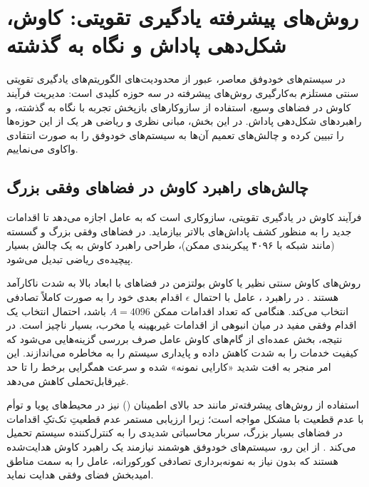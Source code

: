 \documentclass[oneside,openany,phd]{TMU-Thesis}
\begin{document}
\section{روش‌های پیشرفته یادگیری تقویتی: کاوش، شکل‌دهی پاداش و نگاه به گذشته}
\label{sec:ch3_advanced_rl}

در سیستم‌های خودوفق معاصر، عبور از محدودیت‌های الگوریتم‌های یادگیری تقویتی سنتی مستلزم به‌کارگیری روش‌های پیشرفته در سه حوزه کلیدی است: مدیریت فرآیند کاوش در فضاهای وسیع، استفاده از سازوکارهای بازپخش تجربه با نگاه به گذشته، و راهبردهای شکل‌دهی پاداش. در این بخش، مبانی نظری و ریاضی هر یک از این حوزه‌ها را تبیین کرده و چالش‌های تعمیم آن‌ها به سیستم‌های خودوفق را به صورت انتقادی واکاوی می‌نماییم.

\subsection{چالش‌های راهبرد کاوش در فضاهای وفقی بزرگ}
\label{sec:ch3_exploration_challenges}

فرآیند کاوش در یادگیری تقویتی، سازوکاری است که به عامل اجازه می‌دهد تا اقدامات جدید را به منظور کشف پاداش‌های بالاتر بیازماید. در فضاهای وفقی بزرگ و گسسته (مانند شبکه  با ۴۰۹۶ پیکربندی ممکن)، طراحی راهبرد کاوش به یک چالش بسیار پیچیده‌ی ریاضی تبدیل می‌شود.

روش‌های کاوش سنتی نظیر  یا کاوش بولتزمن در فضاهای با ابعاد بالا به شدت ناکارآمد هستند \cite{du2023scalability, du2023alleviating}. در راهبرد ، عامل با احتمال $\epsilon$ اقدام بعدی خود را به صورت کاملاً تصادفی انتخاب می‌کند. هنگامی که تعداد اقدامات ممکن $A = 4096$ باشد، احتمال انتخاب یک اقدام وفقی مفید در میان انبوهی از اقدامات غیربهینه یا مخرب، بسیار ناچیز است. در نتیجه، بخش عمده‌ای از گام‌های کاوش عامل صرف بررسی گزینه‌هایی می‌شود که کیفیت خدمات را به شدت کاهش داده و پایداری سیستم را به مخاطره می‌اندازند. این امر منجر به افت شدید «کارایی نمونه» شده و سرعت همگرایی برخط را تا حد غیرقابل‌تحملی کاهش می‌دهد.

استفاده از روش‌های پیشرفته‌تر مانند حد بالای اطمینان () نیز در محیط‌های پویا و توأم با عدم قطعیت با مشکل مواجه است؛ زیرا ارزیابی مستمر عدم قطعیتِ تک‌تکِ اقدامات در فضاهای بسیار بزرگ، سربار محاسباتی شدیدی را به کنترل‌کننده سیستم تحمیل می‌کند \cite{sutton2018reinforcement}. از این رو، سیستم‌های خودوفق هوشمند نیازمند یک راهبرد کاوش هدایت‌شده هستند که بدون نیاز به نمونه‌برداری تصادفی کورکورانه، عامل را به سمت مناطق امیدبخش فضای وفقی هدایت نماید.
\end{document}
